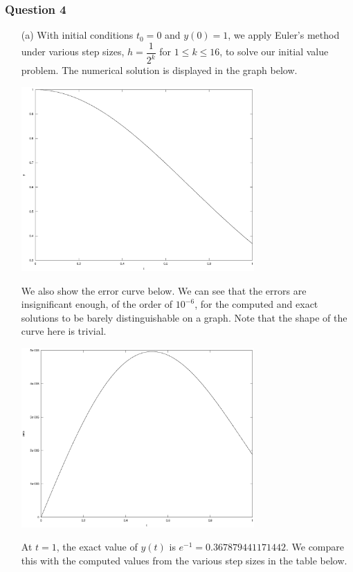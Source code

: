 \documentclass[11pt,a4paper]{article}
\begin{document}
\subsubsection*{Question 4} 
\begin{enumerate}
	\item[(a)] With initial conditions $t_0=0$ and $y(0)=1$, we apply Euler's method under various step sizes, $h=\dfrac{1}{2^k}$ for $1\le k \le 16$, to solve our initial value problem. The numerical solution is displayed in the graph below.
	\begin{center}
		\includegraphics[width=0.7\textwidth]{euler.eps}
	\end{center}
	We also show the error curve below. We can see that the errors are insignificant enough, of the order of $10^{-6}$, for the computed and exact solutions to be barely distinguishable on a graph. Note that the shape of the curve here is trivial.
	\begin{center}
		\includegraphics[width=0.7\textwidth]{error.eps}
	\end{center}
	At $t=1$, the exact value of $y(t)$ is $e^{-1} = 0.367879441171442$. We compare this with the computed values from the various step sizes in the table below.
	

\end{enumerate}
\end{document}
